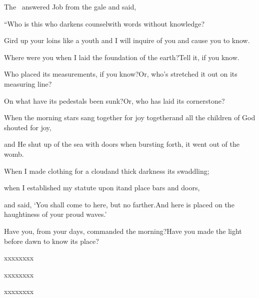 
\begin{inparaenum}
  \pa {} The \lord\ answered Job from the gale and said,%
  
  \pb {} ``Who is this who darkens counsel\pa with words%
  without knowledge?%
  
  \pb {} Gird up your loins%
  like a youth%
  \pa and I will inquire of you and cause you to know.%
  
  \pb {} Where were you when I laid the foundation of the earth?\pa Tell it, if you know.%
  
  \pb {} Who placed its measurements, if you know?\pa Or, who's stretched it out on its measuring line?%
  
  \pb {} On what have its pedestals been sunk?\pa Or, who has laid its cornerstone?%
  
  \pb {} When the morning stars sang together for joy together\pa and all the children of God shouted for joy,%
  
  \pb {} and He shut up of the sea with doors%
  \pa when bursting forth, it went out of the womb.%
  
  \pb {} When I made clothing for a cloud\pa and thick darkness its swaddling;%
  
  \pb {} when I established my statute upon it\pa and place bars and doors,%
  
  \pb {} and said, `You shall come to here, but no farther.\pa And here is placed on the haughtiness of your proud waves.'%
  
  \pb {} Have you, from your days, commanded the morning?\pa Have you made the light before dawn to know its place?%
  
  \pb {} xxxx\pa xxxx%
  
  \pb {} xxxx\pa xxxx%
  
  \pb {} xxxx\pa xxxx%
  

\end{inparaenum}

